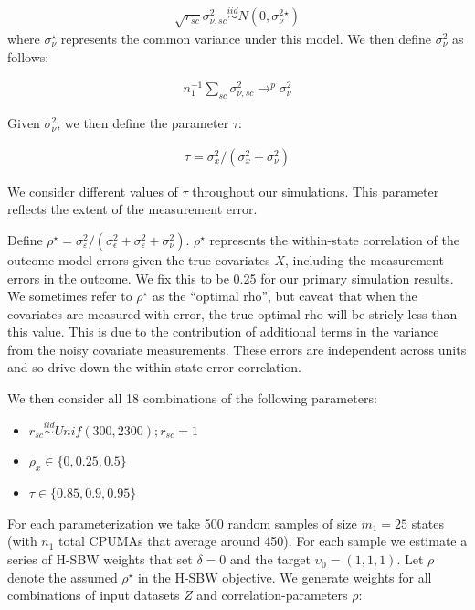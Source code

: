\begin{align*}
    \sqrt{r_{sc}}\sigma^2_{\nu, sc} \stackrel{iid}\sim N(0, \sigma^2_{\nu}^\star)
\end{align*}
%
where $\sigma_{\nu}^\star$ represents the common variance under this model. We then define $\sigma_{\nu}^2$ as follows:

\begin{align*}
     n_1^{-1}\sum_{sc}\sigma^2_{\nu, sc} \to^p \sigma_{\nu}^2
\end{align*}

Given $\sigma_{\nu}^2$, we then define the parameter $\tau$:

\begin{align*}
    \tau = \sigma^2_x/(\sigma^2_x + \sigma^2_{\nu})
\end{align*}

We consider different values of $\tau$ throughout our simulations. This parameter reflects the extent of the measurement error.

Define $\rho^\star = \sigma^2_{\varepsilon}/(\sigma^2_{\epsilon} + \sigma^2_{\varepsilon} + \sigma^2_{\nu})$. $\rho^\star$ represents the within-state correlation of the outcome model errors given the true covariates $X$, including the measurement errors in the outcome. We fix this to be 0.25 for our primary simulation results. We sometimes refer to $\rho^\star$ as the ``optimal rho'', but caveat that when the covariates are measured with error, the true optimal rho will be stricly less than this value. This is due to the contribution of additional terms in the variance from the noisy covariate measurements. These errors are independent across units and so drive down the within-state error correlation.

We then consider all 18 combinations of the following parameters:

\begin{itemize}
    \item $r_{sc} \stackrel{iid}\sim Unif(300, 2300); r_{sc} = 1$ 
    \item $\rho_x \in \{0, 0.25, 0.5\}$
    \item $\tau \in \{0.85, 0.9, 0.95\}$
\end{itemize}

For each parameterization we take 500 random samples of size $m_1 = 25$ states (with $n_1$ total CPUMAs that average around 450). For each sample we estimate a series of H-SBW weights that set $\delta = 0$ and the target $\upsilon_0 = (1, 1, 1)$. Let $\rho$ denote the assumed $\rho^\star$ in the H-SBW objective. We generate weights for all combinations of input datasets $Z$ and correlation-parameters $\rho$:

